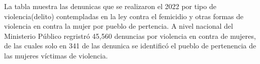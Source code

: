 La tabla muestra las denunicas que se realizaron el 2022 por tipo de violencia(delito) contempladas en la ley contra el femicidio y otras formas de violencia en contra la mujer por pueblo de pertencia. A nivel nacional del Ministerio Público regristró 45,560 denuncias por violencia en contra de mujeres, de las cuales solo en 341 de las denunica se identificó el pueblo de pertenencia de las mujeres víctimas de violencia. 

